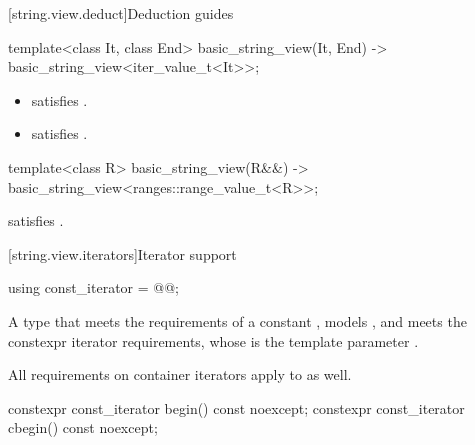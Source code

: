 [string.view.deduct]{Deduction guides}

\begin{itemdecl}
template<class It, class End>
  basic_string_view(It, End) -> basic_string_view<iter_value_t<It>>;
\end{itemdecl}

\begin{itemdescr}
\pnum
\constraints
\begin{itemize}
\item {} satisfies .
\item {} satisfies .
\end{itemize}
\end{itemdescr}

\begin{itemdecl}
template<class R>
  basic_string_view(R&&) -> basic_string_view<ranges::range_value_t<R>>;
\end{itemdecl}

\begin{itemdescr}
\pnum
\constraints
{} satisfies .
\end{itemdescr}

[string.view.iterators]{Iterator support}

%
\begin{itemdecl}
using const_iterator = @@;
\end{itemdecl}

\begin{itemdescr}
\pnum
A type that meets the requirements
of a constant
,
models , and
meets the constexpr iterator requirements,
whose  is the template parameter .

\pnum
All requirements on container iterators apply to  as well.
\end{itemdescr}

%
%
\begin{itemdecl}
constexpr const_iterator begin() const noexcept;
constexpr const_iterator cbegin() const noexcept;
\end{itemdecl}

